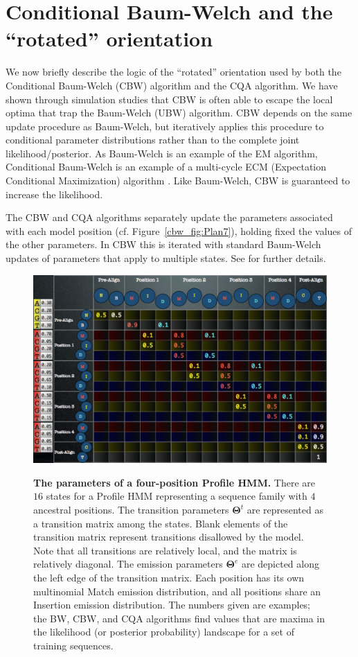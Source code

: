 \documentclass[preprint,12pt,authoryear]{elsarticle}
\newcommand{\Transition}{\ensuremath{t}}
\newcommand{\Emission}{\ensuremath{e}}
\newcommand{\Parameters}{\ensuremath{\bm{\Theta}}}
\newcommand{\TransitionParameters}{\Parameters^{\Transition}}
\newcommand{\EmissionParameters}{\Parameters^{\Emission}}
\begin{document}
\section{Conditional Baum-Welch and the ``rotated'' orientation}
We now briefly describe the logic of the ``rotated'' orientation used by both the Conditional Baum-Welch (CBW) algorithm and the CQA algorithm.  We have shown through simulation studies that CBW is often able to escape the local optima that trap the Baum-Welch (UBW) algorithm.  CBW depends on the same update procedure as Baum-Welch, but iteratively applies this procedure to conditional parameter distributions rather than to the complete joint likelihood/posterior.  As Baum-Welch is an example of the EM algorithm, Conditional Baum-Welch is an example of a multi-cycle ECM (Expectation Conditional Maximization) algorithm \citep{MengECM:1993,meng:1997aof}.  Like Baum-Welch, CBW is guaranteed to increase the likelihood.%

The CBW and CQA algorithms separately update the parameters associated with each model position (cf. Figure~\ref{cbw_fig:Plan7}), holding fixed the values of the other parameters.  In CBW this is iterated with standard Baum-Welch updates of parameters that apply to multiple states.   See \cite{edlefsen2010transposon} for further details.

\begin{figure}[htp]
\centering
\includegraphics[scale=.5]{Plan7Parameters.pdf} \\
 \caption{\textbf{The parameters of a four-position Profile HMM.} There are $16$ states for a Profile HMM representing a sequence family with $4$ ancestral positions.  The transition parameters $\TransitionParameters$ are represented as a transition matrix among the states.  Blank elements of the transition matrix represent transitions disallowed by the model.  Note that all transitions are relatively local, and the matrix is relatively diagonal.  The emission parameters $\EmissionParameters$ are depicted along the left edge of the transition matrix.  Each position has its own multinomial Match emission distribution, and all positions share an Insertion emission distribution.  The numbers given are examples; the BW, CBW, and CQA algorithms find values that are maxima in the likelihood (or posterior probability) landscape for a set of training sequences.}
  \label{cbw_fig:Plan7Parameters}
\end{figure}
\end{document}
